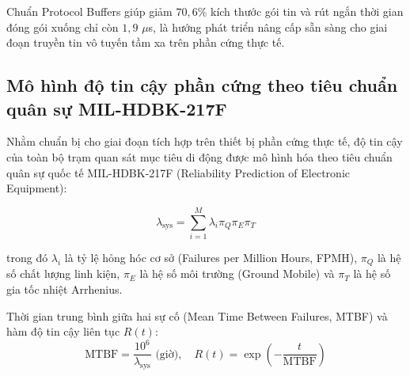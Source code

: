 \begin{table}[H]
\centering
\caption{Khảo sát dung lượng và thời gian tuần tự hóa giữa JSON và các chuẩn nhị phân}
\label{tab:binary-serialization-benchmark}
\end{table}

Chuẩn Protocol Buffers giúp giảm $70{,}6\%$ kích thước gói tin và rút ngắn thời gian đóng gói xuống chỉ còn $1{,}9$ $\mu$s, là hướng phát triển nâng cấp sẵn sàng cho giai đoạn truyền tin vô tuyến tầm xa trên phần cứng thực tế.

\subsection{Mô hình độ tin cậy phần cứng theo tiêu chuẩn quân sự MIL-HDBK-217F}

\hspace{0.5cm} Nhằm chuẩn bị cho giai đoạn tích hợp trên thiết bị phần cứng thực tế, độ tin cậy của toàn bộ trạm quan sát mục tiêu di động được mô hình hóa theo tiêu chuẩn quân sự quốc tế MIL-HDBK-217F (Reliability Prediction of Electronic Equipment):

\begin{equation}
\lambda_{\text{sys}} = \sum_{i=1}^{M} \lambda_i \pi_Q \pi_E \pi_T
\label{eq:mil-reliability-hazard-rate}
\end{equation}

trong đó $\lambda_i$ là tỷ lệ hỏng hóc cơ sở (Failures per Million Hours, FPMH), $\pi_Q$ là hệ số chất lượng linh kiện, $\pi_E$ là hệ số môi trường (Ground Mobile) và $\pi_T$ là hệ số gia tốc nhiệt Arrhenius.

Thời gian trung bình giữa hai sự cố (Mean Time Between Failures, MTBF) và hàm độ tin cậy liên tục $R(t)$:
\begin{equation}
\text{MTBF} = \frac{10^6}{\lambda_{\text{sys}}} \text{ (giờ)}, \quad R(t) = \exp\left(-\frac{t}{\text{MTBF}}\right)
\label{eq:mtbf-and-reliability-function}
\end{equation}

